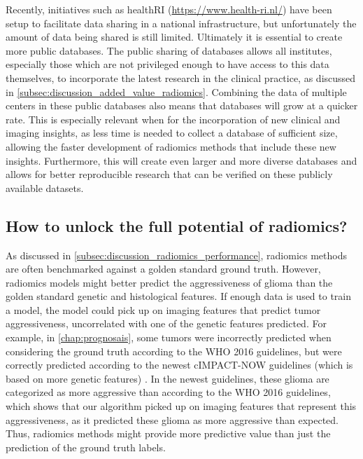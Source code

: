Recently, initiatives such as healthRI (\url{https://www.health-ri.nl/}) have been setup to facilitate data sharing in a national infrastructure, but unfortunately the amount of data being shared is still limited.
Ultimately it is essential to create more public databases.
The public sharing of databases allows all institutes, especially those which are not privileged enough to have access to this data themselves, to incorporate the latest research in the clinical practice, as discussed in \cref{subsec:discussion_added_value_radiomics}.
Combining the data of multiple centers in these public databases also means that databases will grow at a quicker rate.
This is especially relevant when for the incorporation of new clinical and imaging insights, as less time is needed to collect a database of sufficient size, allowing the faster development of radiomics methods that include these new insights.
Furthermore, this will create even larger and more diverse databases and allows for better reproducible research that can be verified on these publicly available datasets.



\subsection{How to unlock the full potential of radiomics?}

As discussed in \cref{subsec:discussion_radiomics_performance}, radiomics methods are often benchmarked against a golden standard ground truth.
However, radiomics models might better predict the aggressiveness of \gls{glioma} than the golden standard genetic and histological features.
If enough data is used to train a model, the model could pick up on imaging features that predict \gls{tumor} aggressiveness, uncorrelated with one of the genetic features predicted.
For example, in \cref{chap:prognosais}, some \glspl{tumor} were incorrectly predicted when considering the ground truth according to the \gls{WHO} 2016 guidelines, but were correctly predicted according to the newest cIMPACT-NOW guidelines (which is based on more genetic features) \autocite{lous2020impactnow}.
In the newest guidelines, these glioma are categorized as more aggressive than according to the \gls{WHO} 2016 guidelines, which shows that our algorithm picked up on imaging features that represent this aggressiveness, as it predicted these glioma as more aggressive than expected.
Thus, radiomics methods might provide more predictive value than just the prediction of the ground truth labels.

